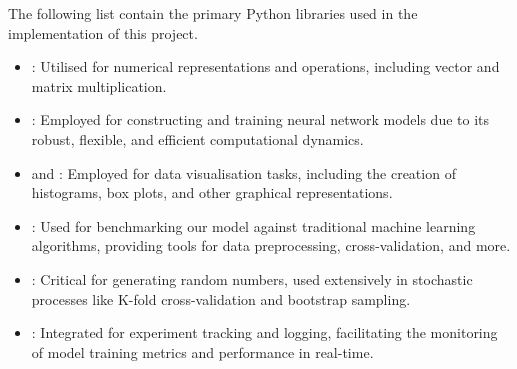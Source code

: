 \documentclass[12pt]{article}
\begin{document}


\newpage




\printbibliography


The following list contain the primary Python libraries used in the implementation of this project.

\vspace{-6pt}

\begin{itemize}
\setlength\itemsep{-0.3em}
  \item {}: Utilised for numerical representations and operations, including vector and matrix multiplication.
  \item {}: Employed for constructing and training neural network models due to its robust, flexible, and efficient computational dynamics.
  \item {} and : Employed for data visualisation tasks, including the creation of histograms, box plots, and other graphical representations.
  \item {}: Used for benchmarking our model against traditional machine learning algorithms, providing tools for data preprocessing, cross-validation, and more.
  \item {}: Critical for generating random numbers, used extensively in stochastic processes like K-fold cross-validation and bootstrap sampling.
  \item {}: Integrated for experiment tracking and logging, facilitating the monitoring of model training metrics and performance in real-time.
\end{itemize}
\end{document}
